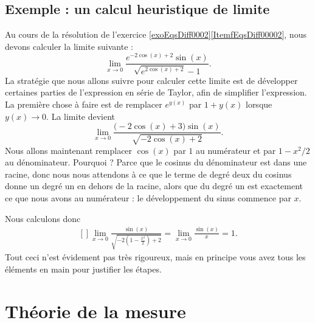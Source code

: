                     \subsection{Exemple : un calcul heuristique de limite}
\label{SubSecCalcLimHeuris}

Au cours de la résolution de l'exercice \ref{exoEqsDiff0002}\ref{ItemfEqsDiff00002}, nous devons calculer la limite suivante :
\begin{equation}
    \lim_{x\to 0} \frac{  e^{-2\cos(x)+2}\sin(x) }{ \sqrt{ e^{2\cos(x)+2}}-1 }.
\end{equation}
La stratégie que nous allons suivre pour calculer cette limite est de développer certaines parties de l'expression en série de Taylor, afin de simplifier l'expression. La première chose à faire est de remplacer $ e^{y(x)}$ par $1+y(x)$ lorsque $y(x)\to 0$. La limite devient
\begin{equation}
    \lim_{x\to 0} \frac{ \big( -2\cos(x)+3 \big)\sin(x) }{ \sqrt{-2\cos(x)+2} }.
\end{equation}
Nous allons maintenant remplacer $\cos(x)$ par $1$ au numérateur et par $1-x^2/2$ au dénominateur. Pourquoi ? Parce que le cosinus du dénominateur est dans une racine, donc nous nous attendons à ce que le terme de degré deux du cosinus donne un degré un en dehors de la racine, alors que du degré un est exactement ce que nous avons au numérateur : le développement du sinus commence par $x$.

Nous calculons donc
\begin{equation}
    \begin{aligned}[]
        \lim_{x\to 0} \frac{ \sin(x) }{ \sqrt{-2\left( 1-\frac{ x^2 }{ 2 } \right)+2} }=\lim_{x\to 0} \frac{ \sin(x) }{ x }=1.
    \end{aligned}
\end{equation}
Tout ceci n'est évidement pas très rigoureux, mais en principe vous avez tous les éléments en main pour justifier les étapes.

\section{Théorie de la mesure}


